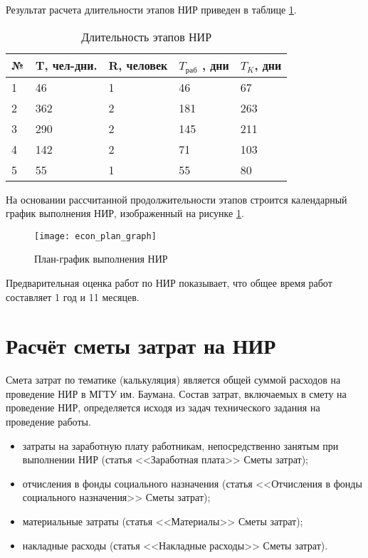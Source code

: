 Результат расчета длительности этапов НИР приведен в таблице \ref{tab:etaps_time_result}.
\begin{table}[h]
	\begin{center}
		\caption{Длительность этапов НИР}
		\begin{tabular}{|p{6mm}|p{29mm}|p{29mm}|p{29mm}|p{29mm}|}
		\hline
№ & T, чел-дни. & R, человек & $T_\text{раб}$ , дни & $T_K$, дни \\ \hline
1 & 46 & 1 & 46 & 67 \\ \hline
2 & 362 & 2 & 181 & 263 \\ \hline
3 & 290 & 2 & 145 & 211 \\ \hline
4 & 142 & 2 & 71 & 103 \\ \hline
5 & 55 & 1 & 55 & 80 \\ \hline
		\end{tabular}
		\label{tab:etaps_time_result}
	\end{center}
\end{table}

\clearpage
На основании рассчитанной продолжительности этапов строится календарный график выполнения НИР, изображенный на рисунке \ref{fig:econ_plan_graph}.

\begin{figure}[h]
	\texttt{[image: econ\_plan\_graph]}
	\caption{План-график выполнения НИР}
	\label{fig:econ_plan_graph}
\end{figure}

Предварительная оценка работ по НИР показывает, что общее время работ составляет 1 год и 11 месяцев.

\clearpage
\section{Расчёт сметы затрат на НИР}
Смета затрат по тематике (калькуляция) является общей суммой расходов на проведение НИР в МГТУ им. Баумана.
Состав затрат, включаемых в смету на проведение НИР, определяется исходя из задач технического задания на проведение работы.
\begin{itemize}
	\item затраты на заработную плату работникам, непосредственно занятым при выполнении НИР (статья <<Заработная плата>> Сметы затрат);
	\item отчисления в фонды социального назначения (статья <<Отчисления в фонды социального назначения>>  Сметы затрат);
	\item материальные затраты (статья <<Материалы>> Сметы затрат);
	\item накладные расходы (статья <<Накладные расходы>> Сметы затрат).
\end{itemize}

